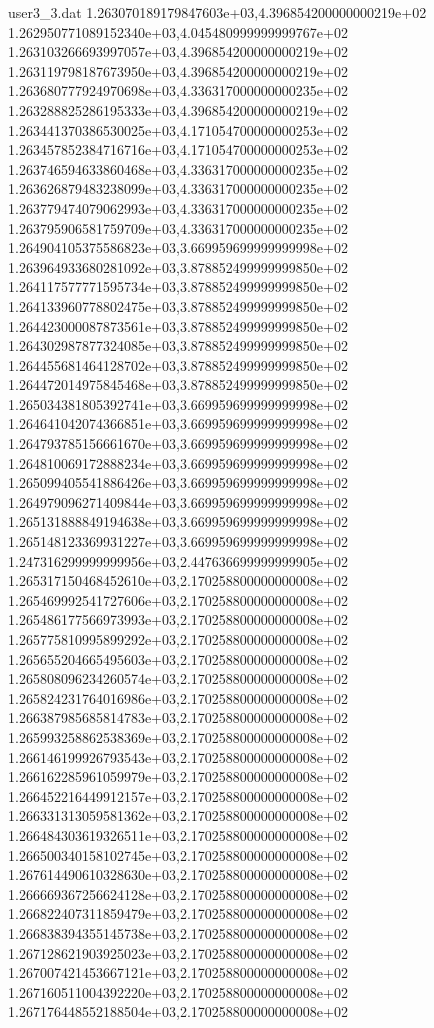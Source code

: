 \begin{filecontents}{user3_3.dat}
1.263070189179847603e+03,4.396854200000000219e+02
1.262950771089152340e+03,4.045480999999999767e+02
1.263103266693997057e+03,4.396854200000000219e+02
1.263119798187673950e+03,4.396854200000000219e+02
1.263680777924970698e+03,4.336317000000000235e+02
1.263288825286195333e+03,4.396854200000000219e+02
1.263441370386530025e+03,4.171054700000000253e+02
1.263457852384716716e+03,4.171054700000000253e+02
1.263746594633860468e+03,4.336317000000000235e+02
1.263626879483238099e+03,4.336317000000000235e+02
1.263779474079062993e+03,4.336317000000000235e+02
1.263795906581759709e+03,4.336317000000000235e+02
1.264904105375586823e+03,3.669959699999999998e+02
1.263964933680281092e+03,3.878852499999999850e+02
1.264117577771595734e+03,3.878852499999999850e+02
1.264133960778802475e+03,3.878852499999999850e+02
1.264423000087873561e+03,3.878852499999999850e+02
1.264302987877324085e+03,3.878852499999999850e+02
1.264455681464128702e+03,3.878852499999999850e+02
1.264472014975845468e+03,3.878852499999999850e+02
1.265034381805392741e+03,3.669959699999999998e+02
1.264641042074366851e+03,3.669959699999999998e+02
1.264793785156661670e+03,3.669959699999999998e+02
1.264810069172888234e+03,3.669959699999999998e+02
1.265099405541886426e+03,3.669959699999999998e+02
1.264979096271409844e+03,3.669959699999999998e+02
1.265131888849194638e+03,3.669959699999999998e+02
1.265148123369931227e+03,3.669959699999999998e+02
1.247316299999999956e+03,2.447636699999999905e+02
1.265317150468452610e+03,2.170258800000000008e+02
1.265469992541727606e+03,2.170258800000000008e+02
1.265486177566973993e+03,2.170258800000000008e+02
1.265775810995899292e+03,2.170258800000000008e+02
1.265655204665495603e+03,2.170258800000000008e+02
1.265808096234260574e+03,2.170258800000000008e+02
1.265824231764016986e+03,2.170258800000000008e+02
1.266387985685814783e+03,2.170258800000000008e+02
1.265993258862538369e+03,2.170258800000000008e+02
1.266146199926793543e+03,2.170258800000000008e+02
1.266162285961059979e+03,2.170258800000000008e+02
1.266452216449912157e+03,2.170258800000000008e+02
1.266331313059581362e+03,2.170258800000000008e+02
1.266484303619326511e+03,2.170258800000000008e+02
1.266500340158102745e+03,2.170258800000000008e+02
1.267614490610328630e+03,2.170258800000000008e+02
1.266669367256624128e+03,2.170258800000000008e+02
1.266822407311859479e+03,2.170258800000000008e+02
1.266838394355145738e+03,2.170258800000000008e+02
1.267128621903925023e+03,2.170258800000000008e+02
1.267007421453667121e+03,2.170258800000000008e+02
1.267160511004392220e+03,2.170258800000000008e+02
1.267176448552188504e+03,2.170258800000000008e+02

\end{filecontents}
